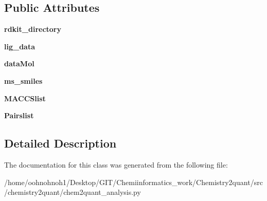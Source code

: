 \subsection*{Public Attributes}
\begin{DoxyCompactItemize}
\item 
\mbox{\label{classchemistry2quant_1_1chem2quant__analysis_1_1rdkitProcessDf_a5f4a9d384d3faf2bac4bad875e82e77f}} 
{\bfseries rdkit\+\_\+directory}
\item 
\mbox{\label{classchemistry2quant_1_1chem2quant__analysis_1_1rdkitProcessDf_ac79af2ff958e5f99d853d17dd5b4ca09}} 
{\bfseries lig\+\_\+data}
\item 
\mbox{\label{classchemistry2quant_1_1chem2quant__analysis_1_1rdkitProcessDf_ab9e638e976cd3225c6dff6e0db4b0b06}} 
{\bfseries data\+Mol}
\item 
\mbox{\label{classchemistry2quant_1_1chem2quant__analysis_1_1rdkitProcessDf_a3c29d89aa2b61f7b79e87c9a0ef95114}} 
{\bfseries ms\+\_\+smiles}
\item 
\mbox{\label{classchemistry2quant_1_1chem2quant__analysis_1_1rdkitProcessDf_a837906c95ce51a9632de265d100b5aa6}} 
{\bfseries M\+A\+C\+C\+Slist}
\item 
\mbox{\label{classchemistry2quant_1_1chem2quant__analysis_1_1rdkitProcessDf_a57eaa83e147be2d2d59ca12095452935}} 
{\bfseries Pairslist}
\end{DoxyCompactItemize}


\subsection{Detailed Description}
\begin{DoxyVerb}\end{DoxyVerb}
 

The documentation for this class was generated from the following file\+:\begin{DoxyCompactItemize}
\item 
/home/oohnohnoh1/\+Desktop/\+G\+I\+T/\+Chemiinformatics\+\_\+work/\+Chemistry2quant/src/chemistry2quant/chem2quant\+\_\+analysis.\+py\end{DoxyCompactItemize}

